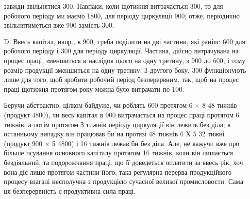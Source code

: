 \parcont{}  %
завжди звільнятися 300. Навпаки, коли щотижня витрачається
300, то для робочого періоду ми маємо 1800, для періоду
циркуляції 900; отже, періодично звільнятиметься вже 900
замість 300.

D. Ввесь капітал, напр., в 900, треба поділити на дві частини,
які раніш: 600 для робочого періоду і 300 для періоду
циркуляції. Частина, дійсно витрачувана на процес праці, зменшиться в
наслідок цього на одну третину, з 900 до 600, і тому розмір продукції
зменшиться на одну третину. З другого боку, 300
функціонують лише для того, щоб зробити робочий період безперервним,
так, щоб на процес праці щотижня протягом року можна було витрачати
по 100.

Беручи абстрактно, цілком байдуже, чи роблять 600 протягом
6 × 8 \deq{} 48 тижнів (продукт \deq{} 4800), чи весь капітал в 900
витрачається на процес праці протягом 6 тижнів, а потім протягом
З тижнів періоду циркуляції він лежить без діла; в останньому випадку
він працював би на протязі 48 тижнів 6 Х 5  \deq{} 32 тижні (продукт \deq{}
900 × 5 \deq{} 4800) і 16 тижнів лежав би без діла. Але, не кажучи
вже про більше псування основного капіталу протягом 16 тижнів, коли
він лишається бездіяльний, та подорожчання праці, що її доведеться оплатити
за ввесь рік, хоч вона діє лише протягом частини його, така регулярна
перерва продукційкого процесу взагалі несполучна з продукцією
сучасної великої промисловости. Сама ця безперервність є продуктивна
сила праці.

